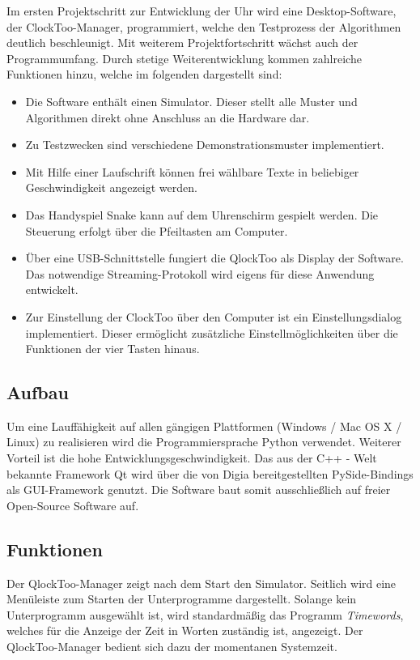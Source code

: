 \begin{multicols}{2}
Im ersten Projektschritt zur Entwicklung der Uhr wird eine Desktop-Software, der ClockToo-Manager, programmiert, welche den Testprozess der Algorithmen deutlich beschleunigt. Mit weiterem Projektfortschritt wächst auch der Programmumfang. Durch stetige Weiterentwicklung kommen zahlreiche Funktionen hinzu, welche im folgenden dargestellt sind:

\begin{itemize}

\item Die Software enthält einen Simulator. Dieser stellt alle Muster und Algorithmen direkt ohne Anschluss an die Hardware dar.
\item Zu Testzwecken sind verschiedene Demonstrationsmuster implementiert.
\item Mit Hilfe einer Laufschrift können frei wählbare Texte in beliebiger Geschwindigkeit angezeigt werden.
\item Das Handyspiel Snake kann auf dem Uhrenschirm gespielt werden. Die Steuerung erfolgt über die Pfeiltasten am Computer.
\item Über eine USB-Schnittstelle fungiert die QlockToo als Display der Software. Das notwendige Streaming-Protokoll wird eigens für diese Anwendung entwickelt. 
\item Zur Einstellung der ClockToo über den Computer ist ein Einstellungsdialog implementiert. Dieser ermöglicht zusätzliche Einstellmöglichkeiten über die Funktionen der vier Tasten hinaus. 
\end{itemize}

\subsection{Aufbau}
Um eine Lauffähigkeit auf allen gängigen Plattformen (Windows / Mac OS X / Linux) zu realisieren wird die Programmiersprache Python verwendet. Weiterer Vorteil ist die hohe Entwicklungsgeschwindigkeit.
Das aus der C++ - Welt bekannte Framework Qt wird über die von Digia bereitgestellten PySide-Bindings als GUI-Framework genutzt. Die Software baut somit ausschließlich auf freier Open-Source Software auf.

\subsection{Funktionen}
Der QlockToo-Manager zeigt nach dem Start den Simulator. Seitlich wird eine Menüleiste zum Starten der Unterprogramme dargestellt.
Solange kein Unterprogramm ausgewählt ist, wird standardmäßig das Programm \emph{Timewords}, welches für die Anzeige der Zeit in Worten zuständig ist, angezeigt. Der QlockToo-Manager bedient sich dazu der momentanen Systemzeit.


\end{multicols}
